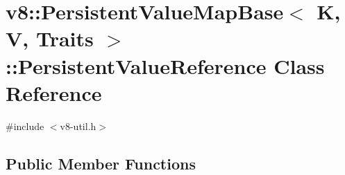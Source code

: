 \hypertarget{classv8_1_1PersistentValueMapBase_1_1PersistentValueReference}{}\section{v8\+:\+:Persistent\+Value\+Map\+Base$<$ K, V, Traits $>$\+:\+:Persistent\+Value\+Reference Class Reference}
\label{classv8_1_1PersistentValueMapBase_1_1PersistentValueReference}


{\ttfamily \#include $<$v8-\/util.\+h$>$}

\subsection*{Public Member Functions}

